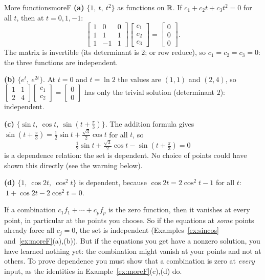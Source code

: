 \documentclass[11pt]{article}
\begin{document}
\begin{exmp}{More functions}{moreF}
\textbf{(a)} $\{1,\ t,\ t^2\}$ as functions on $\mathbb{R}$. If $c_1+c_2t+c_3t^2=0$ for all $t$, then at $t=0,1,-1$:
\[
\begin{bmatrix}1&0&0\\1&1&1\\1&-1&1\end{bmatrix}\begin{bmatrix}c_1\\c_2\\c_3\end{bmatrix}=\begin{bmatrix}0\\0\\0\end{bmatrix}.
\]
The matrix is invertible (its determinant is $2$; or row reduce), so $c_1=c_2=c_3=0$: the three functions are independent.

\textbf{(b)} $\{e^t,\ e^{2t}\}$. At $t=0$ and $t=\ln2$ the values are $(1,1)$ and $(2,4)$, so
$\begin{bmatrix}1&1\\2&4\end{bmatrix}\begin{bmatrix}c_1\\c_2\end{bmatrix}=\begin{bmatrix}0\\0\end{bmatrix}$ has only the trivial solution (determinant $2$): independent.

\textbf{(c)} $\{\sin t,\ \cos t,\ \sin(t+\tfrac{\pi}{3})\}$. The addition formula gives $\sin(t+\tfrac{\pi}{3})=\tfrac12\sin t+\tfrac{\sqrt3}{2}\cos t$ for all $t$, so
\[
\tfrac12\sin t+\tfrac{\sqrt3}{2}\cos t-\sin(t+\tfrac{\pi}{3})=0
\]
is a dependence relation: the set is dependent. No choice of points could have shown this directly (see the warning below).

\textbf{(d)} $\{1,\ \cos2t,\ \cos^2t\}$ is dependent, because $\cos2t=2\cos^2t-1$ for all $t$: $\ 1+\cos2t-2\cos^2t=0$.
\end{exmp}

\begin{warn}
If a combination $c_1f_1+\cdots+c_pf_p$ is the zero function, then it vanishes at every point, in particular at the points you choose. So if the equations at \emph{some} points already force all $c_j=0$, the set is independent (Examples~\ref{ex:sincos} and~\ref{ex:moreF}(a),(b)). But if the equations you get have a nonzero solution, you have learned nothing yet: the combination might vanish at your points and not at others. To prove dependence you must show that a combination is zero at \emph{every} input, as the identities in Example~\ref{ex:moreF}(c),(d) do.
\end{warn}
\end{document}
